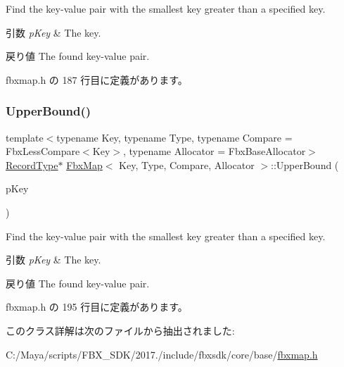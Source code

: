 Find the key-\/value pair with the smallest key greater than a specified key. 
\begin{DoxyParams}{引数}
{\em p\+Key} & The key. \\
\hline
\end{DoxyParams}
\begin{DoxyReturn}{戻り値}
The found key-\/value pair. 
\end{DoxyReturn}


 fbxmap.\+h の 187 行目に定義があります。

\mbox{\label{class_fbx_map_aaaa41638bc860b13b3abc232d1db08e7}} 
\subsubsection{\texorpdfstring{Upper\+Bound()}{UpperBound()}\hspace{0.1cm}{\footnotesize\ttfamily [2/2]}}
{\footnotesize\ttfamily template$<$typename Key, typename Type, typename Compare = Fbx\+Less\+Compare$<$\+Key$>$, typename Allocator = Fbx\+Base\+Allocator$>$ \\
\hyperlink{class_fbx_map_af8fc887461b3bf29f41aa36d15ddb54f}{Record\+Type}$\ast$ \hyperlink{class_fbx_map}{Fbx\+Map}$<$ Key, Type, Compare, Allocator $>$\+::Upper\+Bound (\begin{DoxyParamCaption}\item[{const \hyperlink{class_fbx_map_ad8392c83b6f8eeb9e0706bcc8674270a}{Key\+Type} \&}]{p\+Key }\end{DoxyParamCaption})\hspace{0.3cm}{\ttfamily [inline]}}

Find the key-\/value pair with the smallest key greater than a specified key. 
\begin{DoxyParams}{引数}
{\em p\+Key} & The key. \\
\hline
\end{DoxyParams}
\begin{DoxyReturn}{戻り値}
The found key-\/value pair. 
\end{DoxyReturn}


 fbxmap.\+h の 195 行目に定義があります。



このクラス詳解は次のファイルから抽出されました\+:\begin{DoxyCompactItemize}
\item 
C\+:/\+Maya/scripts/\+F\+B\+X\+\_\+\+S\+D\+K/2017./include/fbxsdk/core/base/\hyperlink{fbxmap_8h}{fbxmap.\+h}\end{DoxyCompactItemize}
